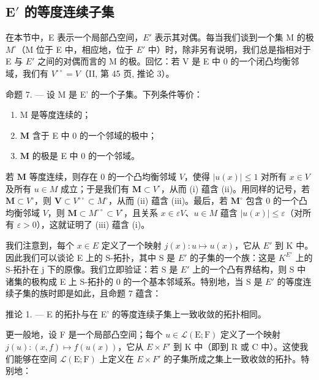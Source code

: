 \subsection{\texorpdfstring{\(\mathbf{E}'\) 的等度连续子集}{\textbackslash mathbf\{E\}\textquotesingle{} 的等度连续子集}}

在本节中，E 表示一个局部凸空间，\(E'\) 表示其对偶。每当我们谈到一个集 M 的极 \(M^{\circ}\)（M 位于 E 中，相应地，位于 \(E'\) 中）时，除非另有说明，我们总是指相对于 E 与 \(E'\) 之间的对偶而言的 M 的极。回忆：若 V 是 E 中 0 的一个闭凸均衡邻域，我们有 \(V^{\circ\circ}=V\)（II, 第 45 页, 推论 3）。

命题 7. --- 设 M 是 E' 的一个子集。下列条件等价：

\begin{enumerate}
\def\labelenumi{(\roman{enumi})}
\item
  M 是等度连续的；
\item
  \(\mathbf{M}\) 含于 E 中 0 的一个邻域的极中；
\item
  \(\mathbf{M}\) 的极是 E 中 0 的一个邻域。
\end{enumerate}

若 \(\mathbf{M}\) 等度连续，则存在 0 的一个凸均衡邻域 \(V\)，使得 \(|u(x)| \leqslant 1\) 对所有 \(x \in V\) 及所有 \(u \in M\) 成立；于是我们有 \(\mathbf{M} \subset V^{\circ}\)，从而 (i) 蕴含 (ii)。用同样的记号，若 \(\mathbf{M} \subset V^{\circ}\)，则 \(\mathbf{V} \subset V^{\circ \circ} \subset M^{\circ}\)，从而 (ii) 蕴含 (iii)。最后，若 \(\mathbf{M}^{\circ}\) 包含 0 的一个凸均衡邻域 \(V\)，则 \(\mathbf{M} \subset M^{\circ \circ} \subset V^{\circ}\)，且关系 \(x \in \varepsilon V\)、\(u \in M\) 蕴含 \(|u(x)| \leqslant \varepsilon\)（对所有 \(\varepsilon > 0\)），这就证明了 (iii) 蕴含 (i)。

我们注意到，每个 \(x \in E\) 定义了一个映射 \(j(x): u \mapsto u(x)\)，它从 \(E'\) 到 K 中。因此我们可以谈论 E 上的 S-拓扑，其中 S 是 \(E'\) 的子集的一个族：这是 \(K^{E'}\) 上的 S-拓扑在 j 下的原像。我们立即验证：若 S 是 \(E'\) 上的一个凸有界结构，则 S 中诸集的极构成 E 上 S-拓扑的 0 的一个基本邻域系。特别地，当 S 是 \(E'\) 的等度连续子集的族时即是如此，且命题 7 蕴含：

推论 1. --- E 的拓扑与在 E' 的等度连续子集上一致收敛的拓扑相同。

更一般地，设 F 是一个局部凸空间；每个 \(u \in \mathcal{L}(\mathrm{E}; \mathrm{F})\) 定义了一个映射 \(j(u):(x, f) \mapsto f(u(x))\)，它从 \(E \times F'\) 到 K 中（即到 R 或 C 中）。这使我们能够在空间 \(\mathcal{L}(\mathrm{E}; \mathrm{F})\) 上定义在 \(E \times F'\) 的子集所成之集上一致收敛的拓扑。特别地：

